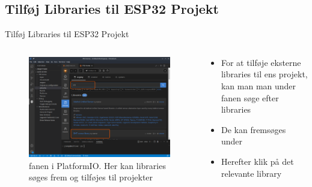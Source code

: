 \documentclass[aspectratio=169]{beamer}
\begin{document}
\subsection{Tilføj Libraries til ESP32 Projekt}
\begin{frame}{Tilføj Libraries til ESP32 Projekt}
\begin{columns}
	\begin{column}{0.5\textwidth}
		\begin{figure}
  			\includegraphics[width=\textwidth,keepaspectratio=true]{assets/pictures/pio-libraries.png}
  			\caption{ fanen i PlatformIO. Her kan libraries søges frem og tilføjes til projekter}
  			\label{fig:pio-libraries}
		\end{figure}
	\end{column}
	\begin{column}{0.5\textwidth}
		\begin{textBox}
			\begin{itemize}
				\item For at tilføje eksterne libraries til ens projekt, kan man man under  fanen søge efter libraries
				\item De kan fremsøges under 
				\item Herefter klik på det relevante library
			\end{itemize}
		\end{textBox}
	\end{column}
\end{columns}
\end{frame}
\end{document}
